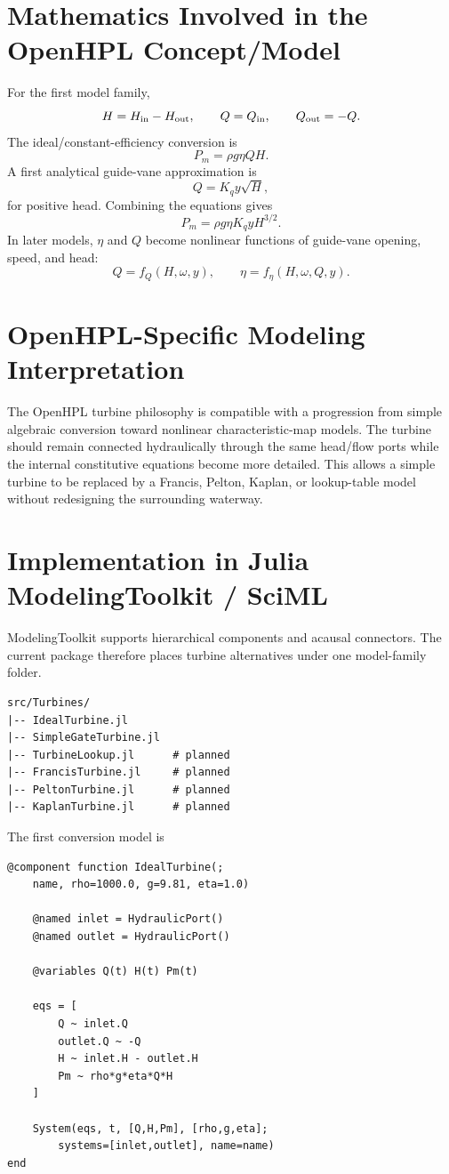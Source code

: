 \documentclass[11pt,a4paper]{article}
\begin{document}
\section{Mathematics Involved in the OpenHPL Concept/Model}
For the first model family,
\[
H=H_{\rm in}-H_{\rm out},
\qquad
Q=Q_{\rm in},
\qquad
Q_{\rm out}=-Q.
\]
The ideal/constant-efficiency conversion is
\[
\boxed{P_m=\rho g\eta QH}.
\]
A first analytical guide-vane approximation is
\[
\boxed{Q=K_q y\sqrt{H}},
\]
for positive head. Combining the equations gives
\[
P_m=\rho g\eta K_q y H^{3/2}.
\]
In later models, $\eta$ and $Q$ become nonlinear functions of guide-vane opening, speed, and head:
\[
Q=f_Q(H,\omega,y),
\qquad
\eta=f_\eta(H,\omega,Q,y).
\]

\section{OpenHPL-Specific Modeling Interpretation}
The OpenHPL turbine philosophy is compatible with a progression from simple algebraic conversion toward nonlinear characteristic-map models. The turbine should remain connected hydraulically through the same head/flow ports while the internal constitutive equations become more detailed. This allows a simple turbine to be replaced by a Francis, Pelton, Kaplan, or lookup-table model without redesigning the surrounding waterway.

\section{Implementation in Julia ModelingToolkit / SciML}
ModelingToolkit supports hierarchical components and acausal connectors. The current package therefore places turbine alternatives under one model-family folder.

\begin{lstlisting}
src/Turbines/
|-- IdealTurbine.jl
|-- SimpleGateTurbine.jl
|-- TurbineLookup.jl      # planned
|-- FrancisTurbine.jl     # planned
|-- PeltonTurbine.jl      # planned
|-- KaplanTurbine.jl      # planned
\end{lstlisting}

The first conversion model is

\begin{lstlisting}
@component function IdealTurbine(;
    name, rho=1000.0, g=9.81, eta=1.0)

    @named inlet = HydraulicPort()
    @named outlet = HydraulicPort()

    @variables Q(t) H(t) Pm(t)

    eqs = [
        Q ~ inlet.Q
        outlet.Q ~ -Q
        H ~ inlet.H - outlet.H
        Pm ~ rho*g*eta*Q*H
    ]

    System(eqs, t, [Q,H,Pm], [rho,g,eta];
        systems=[inlet,outlet], name=name)
end
\end{lstlisting}
\end{document}
